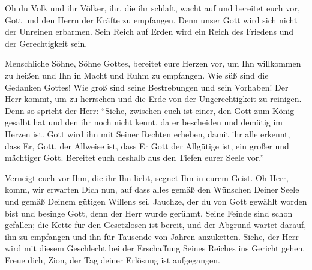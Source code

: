         Oh du Volk und ihr Völker, ihr, die ihr schlaft, wacht auf und bereitet euch vor, Gott und den Herrn der Kräfte zu empfangen. Denn unser Gott wird sich nicht der Unreinen erbarmen. Sein Reich auf Erden wird ein Reich des Friedens und der Gerechtigkeit sein.
         
        Menschliche Söhne, Söhne Gottes, bereitet eure Herzen vor, um Ihn willkommen zu heißen und Ihn in Macht und Ruhm zu empfangen. Wie süß sind die Gedanken Gottes! Wie groß sind seine Bestrebungen und sein Vorhaben! Der Herr kommt, um zu herrschen und die Erde von der Ungerechtigkeit zu reinigen. Denn so spricht der Herr: "`Siehe, zwischen euch ist einer, den Gott zum König gesalbt hat und den ihr noch nicht kennt, da er bescheiden und demütig im Herzen ist. Gott wird ihn mit Seiner Rechten erheben, damit ihr alle erkennt, dass Er, Gott, der Allweise ist, dass Er Gott der Allgütige ist, ein großer und mächtiger Gott. Bereitet euch deshalb aus den Tiefen eurer Seele vor."'
        
        Verneigt euch vor Ihm, die ihr Ihn liebt, segnet Ihn in eurem Geist. Oh Herr, komm, wir erwarten Dich nun, auf dass alles gemäß den Wünschen Deiner Seele und gemäß Deinem gütigen Willens sei. Jauchze, der du von Gott gewählt worden bist und besinge Gott, denn der Herr wurde gerühmt. Seine Feinde sind schon gefallen; die Kette für den Gesetzlosen ist bereit, und der Abgrund wartet darauf, ihn zu empfangen und ihn für Tausende von Jahren anzuketten. Siehe, der Herr wird mit diesem Geschlecht bei der Erschaffung Seines Reiches ins Gericht gehen. Freue dich, Zion, der Tag deiner Erlösung ist aufgegangen. 
        
